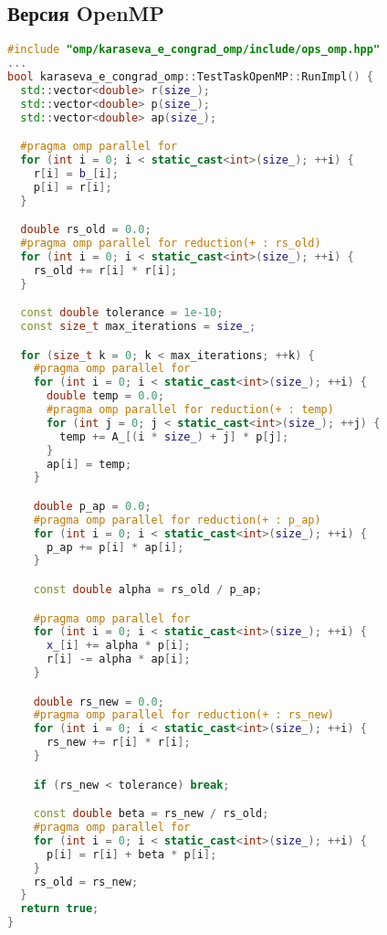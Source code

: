 \documentclass[12pt]{article}
\begin{document}
\subsection{Версия OpenMP}
\begin{lstlisting}[language=C++]
#include "omp/karaseva_e_congrad_omp/include/ops_omp.hpp"
...
bool karaseva_e_congrad_omp::TestTaskOpenMP::RunImpl() {
  std::vector<double> r(size_);
  std::vector<double> p(size_);
  std::vector<double> ap(size_);

  #pragma omp parallel for
  for (int i = 0; i < static_cast<int>(size_); ++i) {
    r[i] = b_[i];
    p[i] = r[i];
  }

  double rs_old = 0.0;
  #pragma omp parallel for reduction(+ : rs_old)
  for (int i = 0; i < static_cast<int>(size_); ++i) {
    rs_old += r[i] * r[i];
  }

  const double tolerance = 1e-10;
  const size_t max_iterations = size_;

  for (size_t k = 0; k < max_iterations; ++k) {
    #pragma omp parallel for
    for (int i = 0; i < static_cast<int>(size_); ++i) {
      double temp = 0.0;
      #pragma omp parallel for reduction(+ : temp)
      for (int j = 0; j < static_cast<int>(size_); ++j) {
        temp += A_[(i * size_) + j] * p[j];
      }
      ap[i] = temp;
    }

    double p_ap = 0.0;
    #pragma omp parallel for reduction(+ : p_ap)
    for (int i = 0; i < static_cast<int>(size_); ++i) {
      p_ap += p[i] * ap[i];
    }

    const double alpha = rs_old / p_ap;

    #pragma omp parallel for
    for (int i = 0; i < static_cast<int>(size_); ++i) {
      x_[i] += alpha * p[i];
      r[i] -= alpha * ap[i];
    }

    double rs_new = 0.0;
    #pragma omp parallel for reduction(+ : rs_new)
    for (int i = 0; i < static_cast<int>(size_); ++i) {
      rs_new += r[i] * r[i];
    }

    if (rs_new < tolerance) break;

    const double beta = rs_new / rs_old;
    #pragma omp parallel for
    for (int i = 0; i < static_cast<int>(size_); ++i) {
      p[i] = r[i] + beta * p[i];
    }
    rs_old = rs_new;
  }
  return true;
}
\end{lstlisting}
\end{document}
